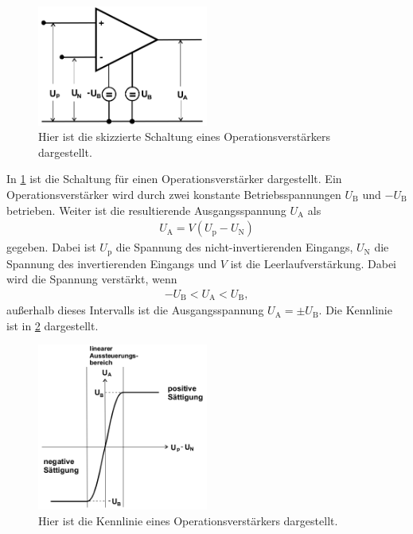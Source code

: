 
\begin{figure}[h!]
	\centering
	\includegraphics[width= 0.5\textwidth]{../Grafiken/OP_Schaltung.png}
	\caption{Hier ist die skizzierte Schaltung eines Operationsverstärkers dargestellt. \cite{V51}\label{fig:OP_Schaltung}}
\end{figure}
\noindent
In \cref{fig:OP_Schaltung} ist die Schaltung für einen Operationsverstärker dargestellt.
Ein Operationsverstärker wird durch zwei konstante Betriebsspannungen $U_\text{B}$ und $-U_\text{B}$ betrieben.
Weiter ist die resultierende Ausgangsspannung $U_\text{A}$ als
\begin{align}
	U_\text{A}=V(U_\text{p}-U_\text{N})
	\label{eq:leerlauf_verstaerkung_opv}
\end{align}
gegeben. 
Dabei ist $U_\text{p}$ die Spannung des nicht-invertierenden Eingangs, $U_\text{N}$ die Spannung des invertierenden Eingangs und $V$ ist die Leerlaufverstärkung.
Dabei wird die Spannung verstärkt, wenn 
\begin{align*}
	-U_\text{B}<U_\text{A}<U_\text{B},
\end{align*}
außerhalb dieses Intervalls ist die Ausgangsspannung $U_\text{A}=\pm U_\text{B}$.
Die Kennlinie ist in \cref{fig:Kennlinie} dargestellt.
\begin{figure}
	\centering
	\includegraphics[width = 0.5\textwidth]{../Grafiken/Op_Kennlinie.png}
	\caption{Hier ist die Kennlinie eines Operationsverstärkers dargestellt. \cite{V51}\label{fig:Kennlinie}}
\end{figure} 
